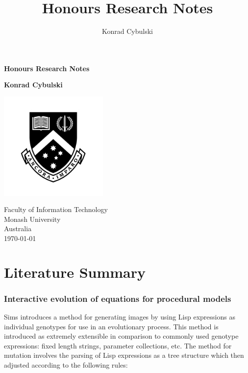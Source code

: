 \documentclass[10pt,a4paper]{article}
\author{Konrad Cybulski}
\title{Honours Research Notes}
\begin{document}
	
\begin{titlepage}
	\begin{center}
		\vspace*{1cm}
		
		\LARGE
		\textbf{Honours Research Notes}
		
		\vspace{2cm}
		\Large
		
		\textbf{Konrad Cybulski}
		
		\vfill
		
		\vspace{0.8cm}
		
		\includegraphics[width=0.4\textwidth]{images/monash_emblem.jpg}
		
		\large
		Faculty of Information Technology\\
		Monash University\\
		Australia\\
		\today
		
	\end{center}
\end{titlepage}

\pagebreak
\tableofcontents
\pagebreak

\section{Literature Summary}

\subsubsection{Interactive evolution of equations for procedural models \cite{sims}}

Sims introduces a method for generating images by using Lisp expressions as individual genotypes for use in an evolutionary process.
This method is introduced as extremely extensible in comparison to commonly used genotype expressions: fixed length strings, parameter collections, etc.
The method for mutation involves the parsing of Lisp expressions as a tree structure which then adjusted according to the following rules:
\end{document}
